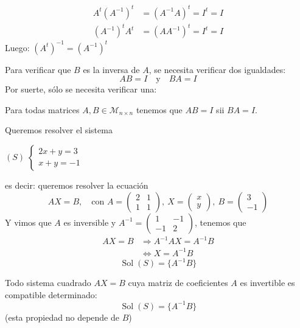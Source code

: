 \documentclass[11pt,a4paper]{article}
\newcommand{\M}{\mathcal{M}}
\DeclareMathOperator{\Sol}{Sol}
\begin{document}
\begin{demo}[Demostración de (5)]
\begin{align*}
A^t(A^{-1})^t&=(A^{-1}A)^t=I^t=I\\
(A^{-1})^tA^t&=(AA^{-1})^t=I^t=I
\end{align*}
Luego: $(A^t)^{-1}=(A^{-1})^t$
\end{demo}

\begin{observacion}
Para verificar que $B$ es la inversa de $A$, se necesita verificar dos igualdades:
\[
AB=I\quad\text{y}\quad BA=I
\]
Por suerte, sólo se necesita verificar una:
\end{observacion}

\begin{lema}
Para todas matrices $A,B\in\M_{n\times n}$ tenemos que $AB=I$ sii $BA=I$.
\end{lema}

\begin{ejemplo}
Queremos resolver el sistema
\begin{center}
$\displaystyle(S)\;\begin{cases}2x+y=3\\x+y=-1\end{cases}$
\end{center}
es decir: queremos resolver la ecuación
\[
AX=B,\quad\text{con } A=\begin{pmatrix}2&1\\1&1\end{pmatrix},\ X=\begin{pmatrix}x\\y\end{pmatrix},\ B=\begin{pmatrix}3\\-1\end{pmatrix}
\]
Y vimos que $A$ es inversible y $A^{-1}=\begin{pmatrix}1&-1\\-1&2\end{pmatrix}$, tenemos que
\begin{align*}
AX=B&\Rightarrow A^{-1}AX=A^{-1}B\\
&\Leftrightarrow X=A^{-1}B
\end{align*}
\[
\Sol(S)=\{A^{-1}B\}
\]
\end{ejemplo}

\begin{proposicion}
Todo sistema cuadrado $AX=B$ cuya matriz de coeficientes $A$ es invertible es compatible determinado:
\[
\Sol(S)=\{A^{-1}B\}
\]
(esta propiedad no depende de $B$)
\end{proposicion}
\end{document}
